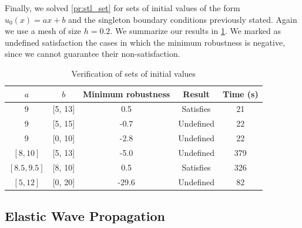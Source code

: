 \documentclass[letterpaper, 10 pt, conference]{ieeeconf/ieeeconf}
\begin{document}
Finally, we solved \cref{pr:stl_set} for sets of initial values of the
form $u_0(x) = a x + b$ and the singleton boundary conditions previously stated. Again we use a
mesh of size $h = 0.2$. We summarize our results in \cref{tab:res_sets}. We
marked as undefined satisfaction the cases in which the minimum robustness is
negative, since we cannot guarantee their non-satisfaction.

\begin{table}
\caption{Verification of sets of initial values}
\label{tab:res_sets}
\centering
\begin{tabular}{|c|c|c|c|c|}
    \hline
    $a$ & $b$ & Minimum robustness & Result & Time (s)  \\
    \hline
    9 & [5, 13] & 0.5 & Satisfies & 21 \\
    9 & [5, 15] & -0.7 & Undefined & 22 \\
    9 & [0, 10] & -2.8 & Undefined & 22 \\
    $[8, 10]$ & [5, 13] & -5.0 & Undefined & 379 \\
    $[8.5, 9.5]$ & [8, 10] & 0.5 & Satisfies & 326 \\
    $[5, 12]$ & [0, 20] & -29.6 & Undefined & 82 \\
    \hline
\end{tabular}
\end{table}

\subsection{Elastic Wave Propagation}
\label{sub:linear_elasticity}
\end{document}
